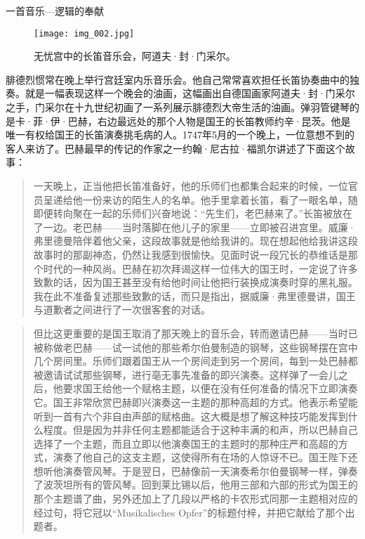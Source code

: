 \begin{intro}{一首音乐—逻辑的奉献}
\begin{figure}[b]
\texttt{[image: img\_002.jpg]}
\caption[无忧宫中的长笛音乐会，阿道夫·封·门采尔作。]
  {无忧宫中的长笛音乐会，阿道夫·封·门采尔。}
\end{figure}

腓德烈惯常在晚上举行宫廷室内乐音乐会。他自己常常喜欢担任长笛协奏曲中的独奏。就是一幅表现这样一个晚会的油画，这幅画出自德国画家阿道夫·封·门采尔之手，门采尔在十九世纪初画了一系列展示腓德烈大帝生活的油画。弹羽管键琴的是卡·菲·伊·巴赫，右边最远处的那个人物是国王的长笛教师约辛·昆茨。他是唯一有权给国王的长笛演奏挑毛病的人。1747年5月的一个晚上，一位意想不到的客人来访了。巴赫最早的传记的作家之一约翰·尼古拉·福凯尔讲述了下面这个故事：

\begin{quote}
一天晚上，正当他把长笛准备好，他的乐师们也都集合起来的时候，一位官员呈递给他一份来访的陌生人的名单。他手里拿着长笛，看了一眼名单，随即便转向聚在一起的乐师们兴奋地说：“先生们，老巴赫来了。”长笛被放在了一边。老巴赫——当时落脚在他儿子的家里——立即被召进宫里。威廉·弗里德曼陪伴着他父亲，这段故事就是他给我讲的。现在想起他给我讲这段故事时的那副神态，仍然让我感到很愉快。见面时说一段冗长的恭维话是那个时代的一种风尚。巴赫在初次拜谒这样一位伟大的国王时，一定说了许多致歉的话，因为国王甚至没有给他时间让他把行装换成演奏时穿的黑礼服。我在此不准备复述那些致歉的话，而只是指出，据威廉·弗里德曼讲，国王与道歉者之间进行了一次很客套的对话。
\end{quote}

\begin{quote}
但比这更重要的是国王取消了那天晚上的音乐会，转而邀请巴赫——当时已被称做老巴赫——试一试他的那些希尔伯曼制造的钢琴，这些钢琴摆在宫中几个房间里。乐师们跟着国王从一个房间走到另一个房间，每到一处巴赫都被邀请试试那些钢琴，进行亳无事先准备的即兴演奏。这样弹了一会儿之后，他要求国王给他一个赋格主题，以便在没有任何准备的情况下立即演奏它。国王非常欣赏巴赫即兴演奏这一主题的那种高超的方式。他表示希望能听到一首有六个非自由声部的赋格曲。这大概是想了解这种技巧能发挥到什么程度。但是因为并非任何主题都能适合于这种丰满的和声，所以巴赫自己选择了一个主题，而且立即以他演奏国王的主题时的那种庄严和高超的方式，演奏了他自己的这支主题，这使得所有在场的人惊讶不已。国王陛下还想听他演奏管风琴。于是翌日，巴赫像前一天演奏希尔伯曼钢琴一样，弹奏了波茨坦所有的管风琴。回到莱比锡以后，他用三部和六部的形式为国王的那个主题谱了曲，另外还加上了几段以严格的卡农形式同那一主题相对应的经过句，将它冠以“Musikalisches Opfer”的标题付梓，并把它献给了那个出题者。
\end{quote}


\end{intro}
